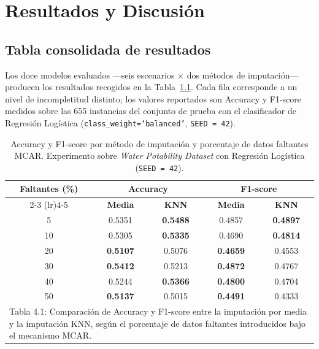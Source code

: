 \chapter{Resultados y Discusión}

\section{Tabla consolidada de resultados}

Los doce modelos evaluados —seis escenarios $\times$ dos métodos de
imputación— producen los resultados recogidos en la
Tabla~\ref{tab:resultados_mcar}. Cada fila corresponde a un nivel de
incompletitud distinto; los valores reportados son Accuracy y F1-score
medidos sobre las 655 instancias del conjunto de prueba con el clasificador
de Regresión Logística (\texttt{class\_weight=‘balanced'}, \texttt{SEED = 42}).

\begin{table}[H]
\centering
\caption{Accuracy y F1-score por método de imputación y porcentaje de
         datos faltantes MCAR. Experimento sobre \textit{Water Potability Dataset}
         con Regresión Logística (\texttt{SEED = 42}).}
\label{tab:resultados_mcar}
\begin{tabular}{@{}ccccc@{}}
\toprule
\multirow{2}{*}{\textbf{Faltantes (\%)}}
  & \multicolumn{2}{c}{\textbf{Accuracy}}
  & \multicolumn{2}{c}{\textbf{F1-score}} \\
\cmidrule(lr){2-3} \cmidrule(lr){4-5}
  & \textbf{Media} & \textbf{KNN} & \textbf{Media} & \textbf{KNN} \\
\midrule
 5  & 0.5351 & \textbf{0.5488} & 0.4857 & \textbf{0.4897} \\
10  & 0.5305 & \textbf{0.5335} & 0.4690 & \textbf{0.4814} \\
20  & \textbf{0.5107} & 0.5076 & \textbf{0.4659} & 0.4553 \\
30  & \textbf{0.5412} & 0.5213 & \textbf{0.4872} & 0.4767 \\
40  & 0.5244 & \textbf{0.5366} & \textbf{0.4800} & 0.4704 \\
50  & \textbf{0.5137} & 0.5015 & \textbf{0.4491} & 0.4333 \\
\bottomrule
\multicolumn{5}{l}{\small Tabla 4.1: Comparación de Accuracy y F1-score entre la
imputación por media y la imputación KNN, según el porcentaje de datos
faltantes introducidos bajo el mecanismo MCAR.}
\end{tabular}
\end{table}


